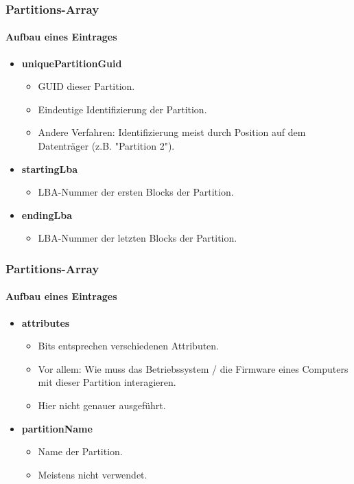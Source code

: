 \begin{frame}
    \frametitle{Partitions-Array}
    \framesubtitle{Aufbau eines Eintrages}

    \begin{itemize}
        \item \textbf{uniquePartitionGuid}
        \begin{itemize}
            \item GUID dieser Partition.
            \item Eindeutige Identifizierung der Partition.
            \item Andere Verfahren: Identifizierung meist durch Position auf dem Datenträger (z.B. "Partition 2").
        \end{itemize}

        \pause
        \item \textbf{startingLba}
        \begin{itemize}
            \item LBA-Nummer der ersten Blocks der Partition.
        \end{itemize}

        \pause
        \item \textbf{endingLba}
        \begin{itemize}
            \item LBA-Nummer der letzten Blocks der Partition.
        \end{itemize}
    \end{itemize}
\end{frame}

\begin{frame}
    \frametitle{Partitions-Array}
    \framesubtitle{Aufbau eines Eintrages}

    \begin{itemize}
        \item \textbf{attributes}
        \begin{itemize}
            \item Bits entsprechen verschiedenen Attributen.
            \item Vor allem: Wie muss das Betriebssystem / die Firmware eines Computers mit dieser Partition interagieren.
            \item Hier nicht genauer ausgeführt.
        \end{itemize}

        \pause
        \item \textbf{partitionName}
        \begin{itemize}
            \item Name der Partition.
            \item Meistens nicht verwendet.
        \end{itemize}
    \end{itemize}
\end{frame}
